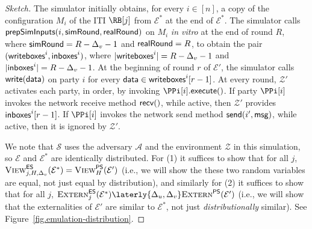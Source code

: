 \begin{proof}[Sketch]
  The simulator initially obtains, for every $i \in [n]$,
  a copy of the configuration $M_i$ of the ITI $\RB[j]$ from $\mathcal{E}^*$ at the end of
  $\mathcal{E}^*$.
  The simulator calls $\textsf{prepSimInputs}(i, \textsf{simRound}, \textsf{realRound})$ on $M_i$
  \emph{in vitro} at the end of round $R$, where $\textsf{simRound} = R - \Delta_v - 1$
  and $\textsf{realRound} = R$, to obtain the pair
  $(\textsf{writeboxes}^i, \textsf{inboxes}^i)$, where
  $|\textsf{writeboxes}^i| = R - \Delta_v - 1$
  and
  $|\textsf{inboxes}^i| = R - \Delta_v - 1$.
  At the beginning of round $r$ of $\mathcal{E}'$, the simulator calls
  $\textsf{write}(\textsf{data})$ on party $i$
  for every $\textsf{data} \in \textsf{writeboxes}^i[r - 1]$.
  At every round, $\mathcal{Z}'$ activates each party, in order,
  by invoking $\PPi[i].\execute()$.
  If party $\PPi[i]$ invokes the network receive method $\textsf{recv}()$, while active,
  then $\mathcal{Z}'$ provides $\textsf{inboxes}^i[r - 1]$.
  If $\PPi[i]$ invokes the network send method $\textsf{send}(i', \textsf{msg})$, while active,
  then it is ignored by $\mathcal{Z}'$.


  We note that $\mathcal{S}$ uses the adversary $\mathcal{A}$ and the
  environment $\mathcal{Z}$ in this simulation, so $\mathcal{E}$
  and $\mathcal{E}^*$ are identically distributed.
  For (1) it suffices to show that for all $j$,
  $\textsc{View}^{\textsf{ES}}_{j,H,\Delta_v}(\mathcal{E}^*) = \textsc{View}^{\textsf{PS}}_H(\mathcal{E}')$
  (i.e., we will show the these two random variables are equal,
  not just equal by distribution),
  and similarly for (2) it suffices to show that for all $j$,
  $\LCExtern_j(\mathcal{E}^*) \laterly{\Delta_u,\Delta_v} \PEExtern(\mathcal{E}')$
  (i.e., we will show that the externalities of $\mathcal{E}'$ are
  similar to $\mathcal{E}^*$, not just \emph{distributionally} similar).
  See Figure~\ref{fig.emulation-distribution}.


\end{proof}
